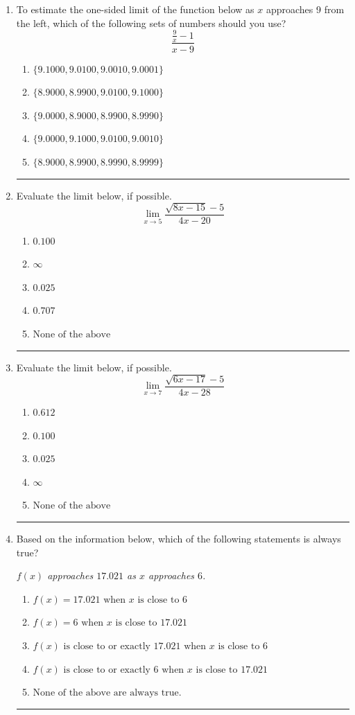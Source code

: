 \documentclass[14pt]{extbook}
\newcommand{\litem}[1]{\item#1\hspace*{-1cm}\rule{\textwidth}{0.4pt}}
\begin{document}
\begin{enumerate}
{\begin{enumerate}[label=\Alph*.]
\end{enumerate} }
\litem{
To estimate the one-sided limit of the function below as $x$ approaches 9 from the left, which of the following sets of numbers should you use?\[ \frac{\frac{9}{x} - 1}{x - 9} \]\begin{enumerate}[label=\Alph*.]
\item \( \{ 9.1000, 9.0100, 9.0010, 9.0001 \} \)
\item \( \{ 8.9000, 8.9900, 9.0100, 9.1000 \} \)
\item \( \{ 9.0000, 8.9000, 8.9900, 8.9990 \} \)
\item \( \{ 9.0000, 9.1000, 9.0100, 9.0010 \} \)
\item \( \{ 8.9000, 8.9900, 8.9990, 8.9999 \} \)

\end{enumerate} }
\litem{
Evaluate the limit below, if possible.\[ \lim_{x \rightarrow 5} \frac{\sqrt{8x - 15} - 5}{4x - 20} \]\begin{enumerate}[label=\Alph*.]
\item \( 0.100 \)
\item \( \infty \)
\item \( 0.025 \)
\item \( 0.707 \)
\item \( \text{None of the above} \)

\end{enumerate} }
\litem{
Evaluate the limit below, if possible.\[ \lim_{x \rightarrow 7} \frac{\sqrt{6x - 17} - 5}{4x - 28} \]\begin{enumerate}[label=\Alph*.]
\item \( 0.612 \)
\item \( 0.100 \)
\item \( 0.025 \)
\item \( \infty \)
\item \( \text{None of the above} \)

\end{enumerate} }
\litem{
Based on the information below, which of the following statements is always true?
\begin{center}
    \textit{ $f(x)$ approaches $17.021$ as $x$ approaches $6$. }
\end{center}
\begin{enumerate}[label=\Alph*.]
\item \( f(x) = 17.021 \text{ when } x \text{ is close to } 6 \)
\item \( f(x) = 6 \text{ when } x \text{ is close to } 17.021 \)
\item \( f(x) \text{ is close to or exactly } 17.021 \text{ when } x \text{ is close to } 6 \)
\item \( f(x) \text{ is close to or exactly } 6 \text{ when } x \text{ is close to } 17.021 \)
\item \( \text{None of the above are always true.} \)


\end{enumerate}}
\end{enumerate}
\end{document}

